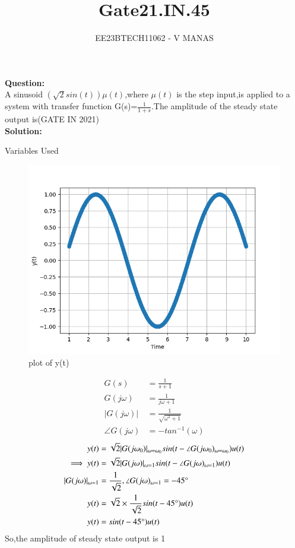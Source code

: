 \documentclass[journal,12pt,twocolumn]{IEEEtran}
\theoremstyle{remark}
\begin{document}

\vspace{3cm}

\title{Gate21.IN.45}
\author{EE23BTECH11062 - V MANAS}
\maketitle
\newpage

\bigskip
\textbf{Question:}\\A sinusoid $(\sqrt{2}sin(t))\mu(t)$,where $\mu(t)$ is the step input,is applied to a system with transfer function G(s)=$\frac{1}{1+s}$.The amplitude of the steady state output is\hfill{(GATE IN 2021)}\\
\textbf{Solution:}
\fi
\begin{table}[h]
    \centering
    
    \caption{Variables Used}
    \label{tab:gate21.in.45}
\end{table}
\begin{figure}[h]
    \centering
    \includegraphics[width=1.0\linewidth]{2021/IN/45/figs/graph.png}
    \caption{plot of y(t)}
\end{figure}
\begin{align}
    G(s)&=\frac{1}{s+1}\\
    G(j\omega)&=\frac{1}{j\omega+1}\\
    |G(j\omega)|&=\frac{1}{\sqrt{\omega^2+1}}\\
    \angle G(j\omega)&=-tan^{-1}(\omega)
\end{align}
\begin{align}
    y(t)&=\sqrt{2}|G(j\omega_0)|_{\omega=\omega_0}sin(t-\angle G(j\omega_0)_{\omega=\omega_0})u(t)\\    
    \implies y(t)&=\sqrt{2}|G(j\omega)|_{\omega=1}sin(t-\angle G(j\omega)_{\omega=1})u(t)\\
    |G(j\omega)|_{\omega=1}&=\frac{1}{\sqrt{2}},\angle G(j\omega)_{\omega=1}=-45\degree\\
    y(t)&=\sqrt{2}\times\frac{1}{\sqrt{2}}sin(t-45\degree)u(t)\\
    y(t)&=sin(t-45\degree)u(t)
\end{align}
So,the amplitude of steady state output is 1
\end{document}

